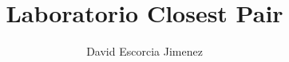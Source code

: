 \documentclass[journal,onecolumn]{IEEEtran}	%
\begin{document}
\title{Laboratorio Closest Pair}%
\author{David Escorcia Jimenez}		%
\maketitle				%





\end{document}
